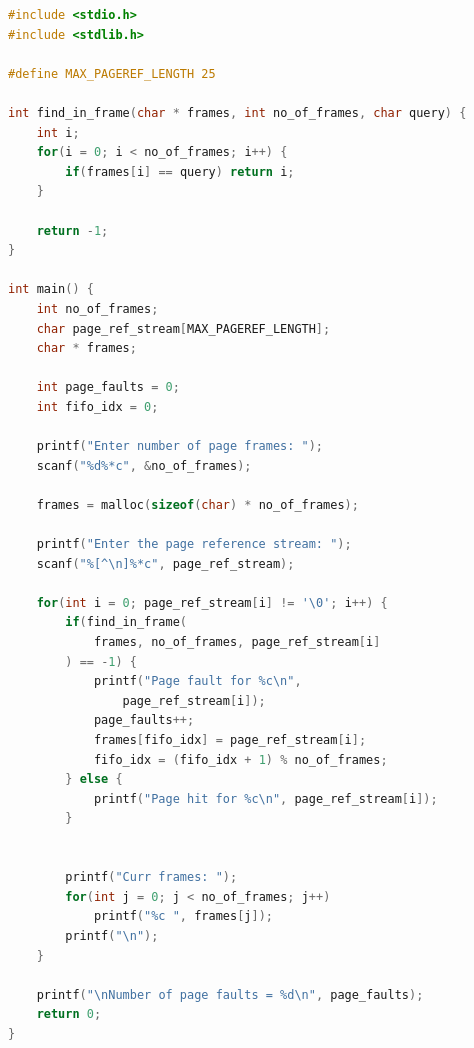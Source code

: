 \documentclass[13pt,oneside]{article}
\begin{document}
\begin{lstlisting}[language=C]
#include <stdio.h>
#include <stdlib.h>

#define MAX_PAGEREF_LENGTH 25

int find_in_frame(char * frames, int no_of_frames, char query) {
	int i;
	for(i = 0; i < no_of_frames; i++) {
		if(frames[i] == query) return i;
	}

	return -1;
}

int main() {
	int no_of_frames;
	char page_ref_stream[MAX_PAGEREF_LENGTH];
	char * frames;

	int page_faults = 0;
	int fifo_idx = 0;

	printf("Enter number of page frames: ");
	scanf("%d%*c", &no_of_frames);

	frames = malloc(sizeof(char) * no_of_frames);

	printf("Enter the page reference stream: ");
	scanf("%[^\n]%*c", page_ref_stream);

	for(int i = 0; page_ref_stream[i] != '\0'; i++) {
		if(find_in_frame(
		    frames, no_of_frames, page_ref_stream[i]
		) == -1) {
			printf("Page fault for %c\n", 
			    page_ref_stream[i]);
			page_faults++;
			frames[fifo_idx] = page_ref_stream[i];
			fifo_idx = (fifo_idx + 1) % no_of_frames;
		} else {
			printf("Page hit for %c\n", page_ref_stream[i]);
		}


		printf("Curr frames: ");
		for(int j = 0; j < no_of_frames; j++) 
		    printf("%c ", frames[j]);
		printf("\n");
	}

	printf("\nNumber of page faults = %d\n", page_faults);
	return 0;
}
\end{lstlisting}
\end{document}
